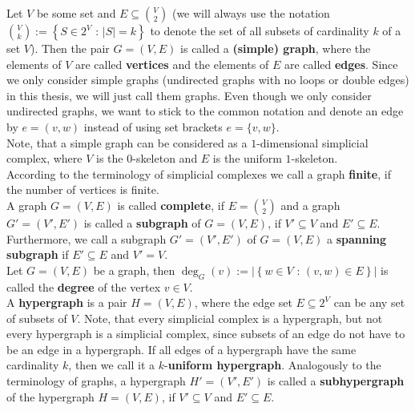 Let \(V\) be some set and \(E\subseteq\binom{V}{2}\) (we will always use the notation\\
\(\binom{V}{k}:=\left\{S\in 2^V\text{ : }\left|S\right|=k\right\}\) to denote the set of all subsets of cardinality \(k\) of a set \(V\)). Then the pair \(G=\left(V,E\right)\) is called a \textbf{(simple) graph}, where the elements of \(V\) are called \textbf{vertices} and the elements of \(E\) are called \textbf{edges}. Since we only consider simple graphs (undirected graphs with no loops or double edges) in this thesis, we will just call them graphs. Even though we only consider undirected graphs, we want to stick to the common notation and denote an edge by \(e=(v,w)\) instead of using set brackets \(e=\{v,w\}\).\\
Note, that a simple graph can be considered as a \(1\)-dimensional simplicial complex, where \(V\) is the \(0\)-skeleton and \(E\) is the uniform \(1\)-skeleton.\\
According to the terminology of simplicial complexes we call a graph \textbf{finite}, if the number of vertices is finite.\\
A graph \(G=(V,E)\) is called \textbf{complete}, if \(E=\binom{V}{2}\) and a graph \(G'=(V',E')\) is called a \textbf{subgraph} of \(G=(V,E)\), if \(V'\subseteq V\) and \(E'\subseteq E\). Furthermore, we call a subgraph \(G'=(V',E')\) of \(G=(V,E)\) a \textbf{spanning subgraph} if \(E'\subseteq E\) and \(V'=V\).\\
Let \(G=(V,E)\) be a graph, then \(\deg_G(v):=\left|\left\{w\in V\text{ : }(v,w)\in E\right\}\right|\) is called the \textbf{degree} of the vertex \(v\in V\).\\
A \textbf{hypergraph} is a pair \(H=(V,E)\), where the edge set \(E\subseteq 2^V\) can be any set of subsets of \(V\). Note, that every simplicial complex is a hypergraph, but not every hypergraph is a simplicial complex, since subsets of an edge do not have to be an edge in a hypergraph. If all edges of a hypergraph have the same cardinality \(k\), then we call it a \(k\)-\textbf{uniform hypergraph}. Analogously to the terminology of graphs, a hypergraph \(H'=(V',E')\) is called a \textbf{subhypergraph} of the hypergraph \(H=(V,E)\), if \(V'\subseteq V\) and \(E'\subseteq E\).